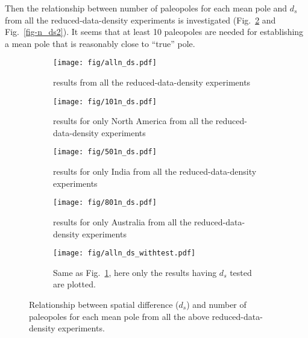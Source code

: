 Then the relationship between number of paleopoles for each mean pole and $d_s$
from all the reduced-data-density experiments is investigated
(Fig.~\ref{fig-n_ds} and Fig.~\ref{fig-n_ds2}). It seems that at least 10
paleopoles are needed for establishing a mean pole that is reasonably close to
``true'' pole.

\begin{figure}
	\centering
	\begin{subfigure}{.49\textwidth}
		\texttt{[image: fig/alln\_ds.pdf]}
		\caption{results from all the reduced-data-density
		experiments}\label{fig-n_ds01}
	\end{subfigure}
	\begin{subfigure}{.49\textwidth}
		\texttt{[image: fig/101n\_ds.pdf]}
		\caption{results for only North America from all the reduced-data-density experiments}
	\end{subfigure}
	\begin{subfigure}{.49\textwidth}
		\texttt{[image: fig/501n\_ds.pdf]}
		\caption{results for only India from all the reduced-data-density experiments}
	\end{subfigure}
	\begin{subfigure}{.49\textwidth}
		\texttt{[image: fig/801n\_ds.pdf]}
		\caption{results for only Australia from all the reduced-data-density experiments}
	\end{subfigure}
	\begin{subfigure}{.49\textwidth}
		\texttt{[image: fig/alln\_ds\_withtest.pdf]}
		\caption{Same as Fig.~\ref{fig-n_ds01}, here only the results having
		$d_s$ tested are plotted.}
	\end{subfigure}
	\caption[ ]{Relationship between spatial difference ($d_s$) and number of
	paleopoles for each mean pole from all the above reduced-data-density
	experiments.}\label{fig-n_ds}
\end{figure}

